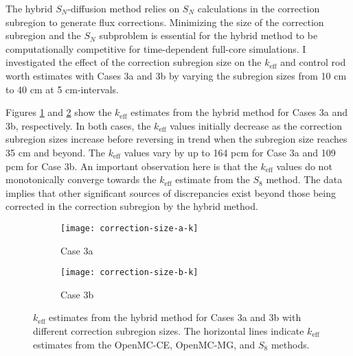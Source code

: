 The hybrid $S_N$-diffusion method relies on $S_N$ calculations in the correction subregion to
generate flux corrections. Minimizing the size of the correction subregion and the $S_N$ subproblem
is essential for the hybrid method to be computationally competitive for time-dependent full-core
simulations. I investigated the effect of the correction subregion size on the $k_\text{eff}$ and
control rod worth estimates with Cases 3a and 3b by varying the subregion sizes from 10 cm to 40 cm
at 5 cm-intervals.

Figures \ref{fig:v1-size-a-k} and \ref{fig:v1-size-b-k} show the $k_\text{eff}$ estimates from the
hybrid method for Cases 3a and 3b, respectively. In both cases, the $k_\text{eff}$ values initially
decrease as the correction subregion sizes increase before reversing in trend when the subregion
size reaches 35 cm and beyond. The $k_\text{eff}$ values vary by up to 164 pcm for Case 3a and 109
pcm for Case 3b. An important observation here is that the $k_\text{eff}$ values do not
monotonically converge towards the $k_\text{eff}$ estimate from the $S_8$ method. The data implies
that other significant sources of discrepancies exist beyond those being corrected in the
correction subregion by the hybrid method.


\begin{figure}[htb!]
  \centering
  \begin{subfigure}[b]{0.49\columnwidth}
    \centering
    \texttt{[image: correction-size-a-k]}
    \caption{Case 3a}
    \label{fig:v1-size-a-k}
  \end{subfigure}
  \hfill
  \begin{subfigure}[b]{0.49\columnwidth}
    \centering
    \texttt{[image: correction-size-b-k]}
    \caption{Case 3b}
    \label{fig:v1-size-b-k}
  \end{subfigure}
  \caption{$k_\text{eff}$ estimates from the hybrid method for Cases 3a and 3b with different
  correction subregion sizes. The horizontal lines indicate $k_\text{eff}$ estimates from the
  OpenMC-CE, OpenMC-MG, and $S_8$ methods.}
  \label{fig:v1-size-k}
\end{figure}


